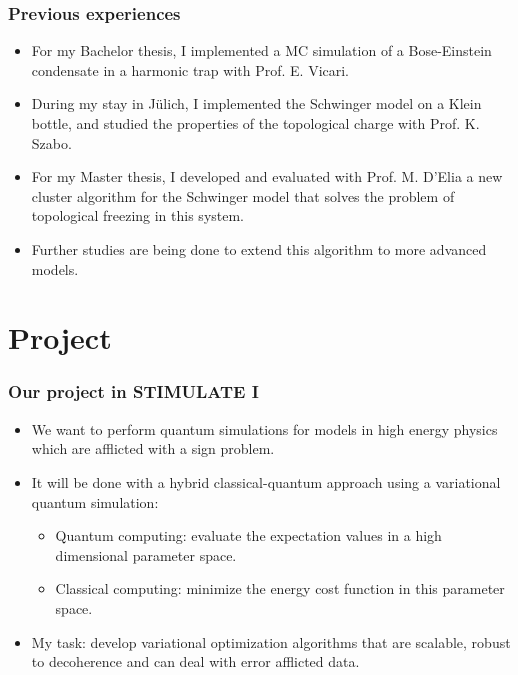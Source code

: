 \documentclass[11pt,t,xcolor=dvipsnames,aspectratio=169]{beamer}
\begin{document}
\begin{frame}
    \frametitle{Previous experiences}
    \begin{itemize}
        \item
            For my Bachelor thesis, I implemented a MC simulation of a Bose-Einstein condensate in a harmonic trap with Prof. E. Vicari.
        \item
            During my stay in J\"ulich, I implemented the Schwinger model on a Klein bottle, and studied the properties of the topological charge with Prof. K. Szabo.
        \item
            For my Master thesis, 
            I developed and evaluated with Prof. M. D'Elia
            a new cluster algorithm for the Schwinger model that solves the problem of topological freezing in this system.
        \item
            Further studies are being done to extend this algorithm to more advanced models.
    \end{itemize}
\end{frame}

\section{Project}

\begin{frame}
    \frametitle{Our project in STIMULATE I}
    \begin{itemize}
        \item
            We want to perform quantum simulations for models in high energy physics which are afflicted with a sign problem.
        \item
            It will be done with a hybrid classical-quantum approach using a variational quantum simulation:
            \begin{itemize}
                \item
                    Quantum computing: evaluate the expectation values in a high dimensional parameter space.
                \item
                    Classical computing: minimize the energy cost function in this parameter space.
            \end{itemize}
        \item
            My task: develop variational optimization algorithms that are scalable,
            robust to decoherence and can deal with error afflicted data.
    \end{itemize}
\end{frame}
\end{document}

